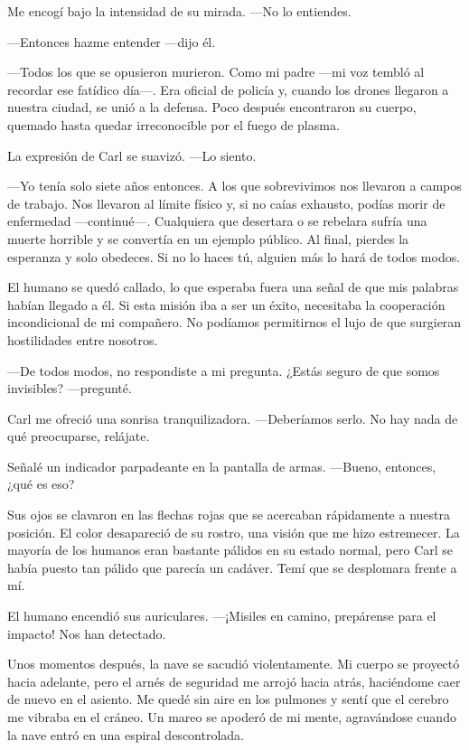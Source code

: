 Me encogí bajo la intensidad de su mirada. —No lo entiendes.

—Entonces hazme entender —dijo él.

—Todos los que se opusieron murieron. Como mi padre —mi voz tembló al recordar ese fatídico día—. Era oficial de policía y, cuando los drones llegaron a nuestra ciudad, se unió a la defensa. Poco después encontraron su cuerpo, quemado hasta quedar irreconocible por el fuego de plasma.

La expresión de Carl se suavizó. —Lo siento.

—Yo tenía solo siete años entonces. A los que sobrevivimos nos llevaron a campos de trabajo. Nos llevaron al límite físico y, si no caías exhausto, podías morir de enfermedad —continué—. Cualquiera que desertara o se rebelara sufría una muerte horrible y se convertía en un ejemplo público. Al final, pierdes la esperanza y solo obedeces. Si no lo haces tú, alguien más lo hará de todos modos.

El humano se quedó callado, lo que esperaba fuera una señal de que mis palabras habían llegado a él. Si esta misión iba a ser un éxito, necesitaba la cooperación incondicional de mi compañero. No podíamos permitirnos el lujo de que surgieran hostilidades entre nosotros.

—De todos modos, no respondiste a mi pregunta. ¿Estás seguro de que somos invisibles? —pregunté.

Carl me ofreció una sonrisa tranquilizadora. —Deberíamos serlo. No hay nada de qué preocuparse, relájate.

Señalé un indicador parpadeante en la pantalla de armas. —Bueno, entonces, ¿qué es eso?

Sus ojos se clavaron en las flechas rojas que se acercaban rápidamente a nuestra posición. El color desapareció de su rostro, una visión que me hizo estremecer. La mayoría de los humanos eran bastante pálidos en su estado normal, pero Carl se había puesto tan pálido que parecía un cadáver. Temí que se desplomara frente a mí.

El humano encendió sus auriculares. —¡Misiles en camino, prepárense para el impacto! Nos han detectado.

Unos momentos después, la nave se sacudió violentamente. Mi cuerpo se proyectó hacia adelante, pero el arnés de seguridad me arrojó hacia atrás, haciéndome caer de nuevo en el asiento. Me quedé sin aire en los pulmones y sentí que el cerebro me vibraba en el cráneo. Un mareo se apoderó de mi mente, agravándose cuando la nave entró en una espiral descontrolada.

